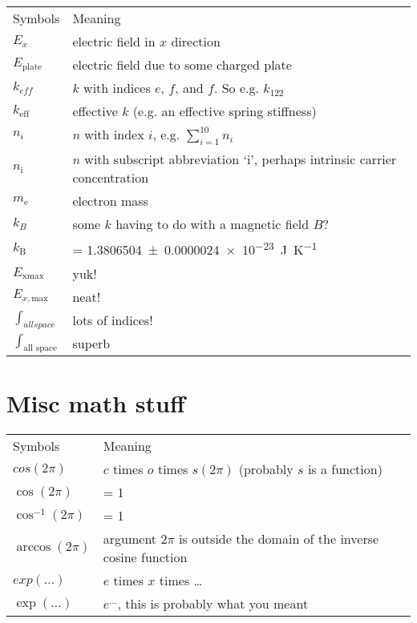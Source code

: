 \documentclass[fleqn, 12pt]{iopart-mod}
\begin{document}
\begin{tabular}{@{}ll@{}}
\toprule
Symbols   &  Meaning \\
\cmidrule(r){1-1}\cmidrule(l){2-2}
$E_x$            & electric field in $x$ direction \\
$E_\text{plate}$ & electric field due to some charged plate \\
$k_{eff}$        & $k$ with indices $e$, $f$, and $f$. So e.g. $k_{122}$ \\
$k_\text{eff}$   & effective $k$ (e.g. an effective spring stiffness) \\
$n_i$            & $n$ with index $i$, e.g. $\displaystyle\sum_{i=1}^{10} {n_i}$ \\
$n_\text{i}$     & $n$ with subscript abbreviation `i', perhaps intrinsic carrier concentration \\
$m_\text{e}$     & electron mass \\
$k_B$            & some $k$ having to do with a magnetic field $B$? \\
$k_\text{B}$     & = \SI{1.3806504(24)e-23}{\joule\per\kelvin} \\
$E_\text{xmax}$  & yuk! \\
$E_{x,\text{max}}$  & neat! \\
$\displaystyle\int_{all space}$ & lots of indices! \\
$\displaystyle\int_\text{all space}$ & superb \\
\bottomrule
\end{tabular}

\section{Misc math stuff}

\begin{tabular}{@{}ll@{}}
\toprule
Symbols   &  Meaning \\
\cmidrule(r){1-1}\cmidrule(l){2-2}
$cos(2\pi)$      & $c$ times $o$ times $s(2\pi)$ (probably $s$ is a function) \\ 
$\cos(2\pi)$     & = 1 \\
$\cos^{-1}(2\pi)$     & = 1 \\
$\arccos(2\pi)$     & argument $2\pi$ is outside the domain of the inverse cosine function \\
$exp(\ldots)$    & $e$ times $x$ times \ldots \\
$\exp(\ldots)$    & $e^{\ldots}$, this is probably what you meant \\
\bottomrule
\end{tabular}
\end{document}
